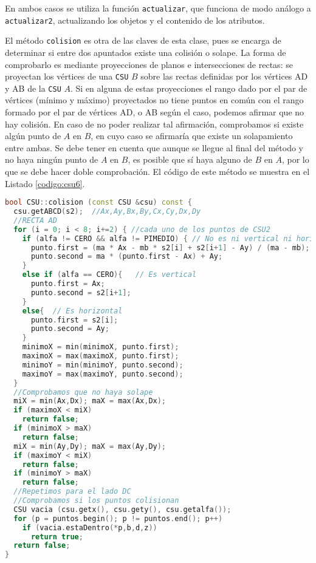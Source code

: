 En ambos casos se utiliza la función \texttt{actualizar}, que funciona de modo
análogo a \texttt{actualizar2}, actualizando los objetos y el contenido de los
atributos.

El método \texttt{colision} es otra de las claves de esta clase, pues se encarga
de determinar si entre dos apuntados existe una colisión o solape. La forma de
comprobarlo es mediante proyecciones de planos e intersecciones de rectas: se
proyectan los vértices de una \texttt{CSU} $B$ sobre las rectas definidas por
los vértices AD y AB de la \texttt{CSU} $A$. Si en alguna de estas proyecciones
el rango dado por el par de vértices (mínimo y máximo) proyectados no tiene
puntos en común con el rango formado por el par de vértices AD, o AB según el
caso, podemos afirmar que no hay colisión. En caso de no poder realizar tal
afirmación, comprobamos si existe algún punto de $A$ en $B$, en cuyo caso se
afirmaría que existe un solapamiento entre ambas. Se debe tener en cuenta que
aunque se llegue al final del método y no haya ningún punto de $A$ en $B$, es
posible que sí haya alguno de $B$ en $A$, por lo que se debe hacer doble
comprobación. El código de este método se muestra en el Listado
\ref{codigo:csu6}.

\begin{lstlisting}[float=tpb,
                   language=C++, basicstyle=\ttfamily\footnotesize, numbers=none,
                   caption={Código del método que comprueba las colisiones},
                   label={codigo:csu6}]
bool CSU::colision (const CSU &csu) const {
  csu.getABCD(s2);  //Ax,Ay,Bx,By,Cx,Cy,Dx,Dy
  //RECTA AD
  for (i = 0; i < 8; i+=2) { //cada uno de los puntos de CSU2
    if (alfa != CERO && alfa != PIMEDIO) { // No es ni vertical ni horizontal
      punto.first = (ma * Ax - mb * s2[i] + s2[i+1] - Ay) / (ma - mb);
      punto.second = ma * (punto.first - Ax) + Ay;
    }
    else if (alfa == CERO){   // Es vertical
      punto.first = Ax;
      punto.second = s2[i+1];
    }
    else{  // Es horizontal
      punto.first = s2[i];
      punto.second = Ay;
    }
    minimoX = min(minimoX, punto.first);
    maximoX = max(maximoX, punto.first);
    minimoY = min(minimoY, punto.second);
    maximoY = max(maximoY, punto.second);
  }
  //Comprobamos que no haya solape
  miX = min(Ax,Dx); maX = max(Ax,Dx);
  if (maximoX < miX)
    return false;
  if (minimoX > maX)
    return false;
  miX = min(Ay,Dy); maX = max(Ay,Dy);
  if (maximoY < miX)
    return false;
  if (minimoY > maX)
    return false;
  //Repetimos para el lado DC
  //Comprobamos si los puntos colisionan
  CSU vacia (csu.getx(), csu.gety(), csu.getalfa());
  for (p = puntos.begin(); p != puntos.end(); p++)
    if (vacia.estaDentro(*p,b,d,z))
      return true;
  return false;
}
\end{lstlisting}
